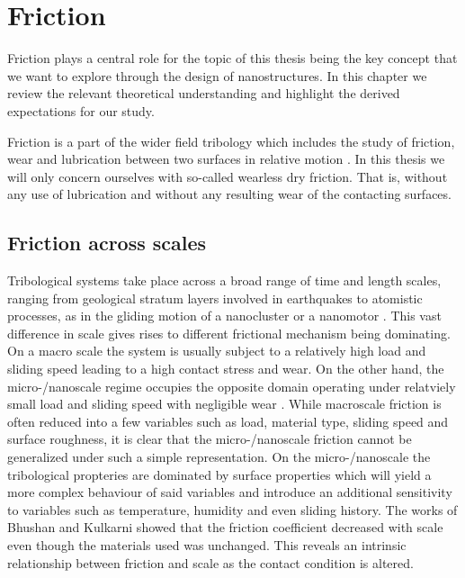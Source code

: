 





\chapter{Friction} %
Friction plays a central role for the topic of this thesis being the key concept that we want to explore through the design of nanostructures. In this chapter we review the relevant theoretical understanding and highlight the derived expectations for our study.

Friction is a part of the wider field tribology which includes the study of
friction, wear and lubrication between two surfaces in relative motion \cite[p.
1]{gnecco_meyer_2015}. In this thesis we will only concern ourselves with so-called wearless dry friction. That is, without any use of lubrication and without any resulting wear of the contacting surfaces. 

\section{Friction across scales}
Tribological systems take place across a broad
range of time and length scales, ranging from geological stratum layers involved
in earthquakes \cite{kim_nano-scale_2009} to atomistic processes, as
in the gliding motion of a nanocluster or a nanomotor \cite{Manini_2016}. This
vast difference in scale gives rises to different frictional mechanism being
dominating. On a macro scale the system is usually subject
to a relatively high load and sliding speed leading to a high contact stress and
wear. On the other hand, the micro-/nanoscale regime occupies the opposite domain operating under relatviely small load and sliding speed with negligible wear \cite{kim_nano-scale_2009} \cite[p. 5]{bhushan_2013}. While macroscale friction is often reduced into a few variables such as load, material type, sliding speed and surface roughness, it is clear that the micro-/nanoscale friction cannot be generalized under such a simple representation. On the micro-/nanoscale the tribological propteries are dominated by surface properties which will yield a more complex behaviour of said variables and introduce an additional sensitivity to variables such as temperature, humidity and even sliding history. The works of Bhushan and Kulkarni \cite{BHUSHAN199649} showed that the friction coefficient decreased with scale even though the materials used was unchanged. This reveals an intrinsic relationship between friction and scale as the contact condition is altered.

